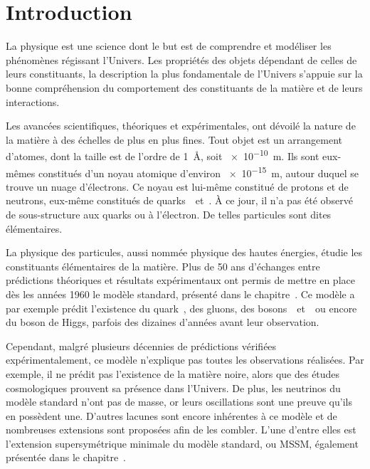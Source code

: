 \chapter*{Introduction}\label{chapter-introduction}

La physique est une science dont le but est de
comprendre et modéliser les phénomènes régissant l'Univers.
Les propriétés des objets dépendant de celles de leurs constituants,
la description la plus fondamentale de l'Univers s'appuie sur la bonne compréhension
du comportement des constituants de la matière et de leurs interactions.
\par
Les avancées scientifiques, théoriques et expérimentales,
ont dévoilé la nature de la matière à des échelles de plus en plus fines.
Tout objet est un arrangement d'atomes, dont la taille est de l'ordre de
\SI{1}{\angstrom}, soit \SI{e-10}{\meter}.
Ils sont eux-mêmes constitués d'un noyau atomique d'environ \SI{e-15}{\meter},
autour duquel se trouve un nuage d'électrons.
Ce noyau est lui-même constitué de protons et de neutrons,
eux-même constitués de quarks~\quarku\ et~\quarkd.
À ce jour, il n'a pas été observé de sous-structure aux quarks ou à l'électron.
De telles particules sont dites élémentaires.
\par
La physique des particules, aussi nommée physique des hautes énergies, étudie les constituants élémentaires de la matière.
Plus de 50 ans d'échanges entre prédictions théoriques et résultats expérimentaux
ont permis de mettre en place dès les années 1960 le modèle standard,
présenté dans le chapitre~.
Ce modèle a par exemple prédit l'existence
du quark~\quarkt,
des gluons,
des bosons~\Wboson\ et~\Zboson\
ou encore
du boson de Higgs,
parfois des dizaines d'années avant leur observation.
\par
Cependant,
malgré plusieurs décennies de prédictions vérifiées expérimentalement,
ce modèle n'explique pas toutes les observations réalisées.
Par exemple,
il ne prédit pas l'existence de la matière noire,
alors que des études cosmologiques
prouvent sa présence dans l'Univers.
De plus, les neutrinos du modèle standard n'ont pas de masse,
or 
leurs oscillations sont une preuve qu'ils en possèdent une.
D'autres lacunes sont encore inhérentes à ce modèle
et
de nombreuses extensions sont proposées afin de les combler.
L'une d'entre elles est l'extension supersymétrique minimale du modèle standard, ou MSSM,
également présentée dans le chapitre~\refChMSSM.
